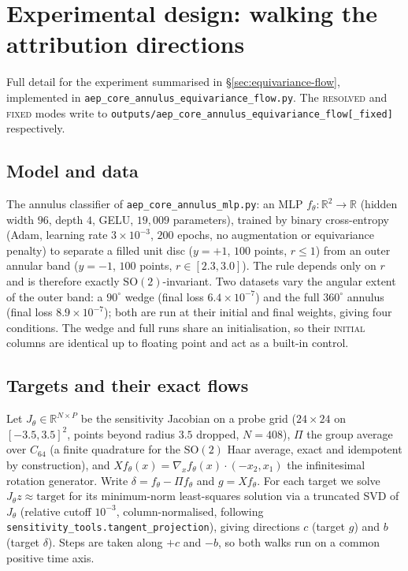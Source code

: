 \section{Experimental design: walking the attribution directions}
\label{app:equivariance-flow}

Full detail for the experiment summarised in
\S\ref{sec:equivariance-flow}, implemented in
\texttt{aep\_core\_annulus\_equivariance\_flow.py}. The \textsc{resolved} and
\textsc{fixed} modes write to
\texttt{outputs/aep\_core\_annulus\_equivariance\_flow[\_fixed]} respectively.

\subsection{Model and data}

The annulus classifier of \texttt{aep\_core\_annulus\_mlp.py}: an MLP
$f_\theta:\mathbb{R}^2\to\mathbb{R}$ (hidden width $96$, depth $4$, GELU,
$19{,}009$ parameters), trained by binary cross-entropy (Adam, learning rate
$3\times10^{-3}$, $200$ epochs, no augmentation or equivariance penalty) to
separate a filled unit disc ($y=+1$, $100$ points, $r\le1$) from an outer
annular band ($y=-1$, $100$ points, $r\in[2.3,3.0]$). The rule depends only
on $r$ and is therefore exactly $\mathrm{SO}(2)$-invariant. Two datasets vary
the angular extent of the outer band: a $90^\circ$ wedge (final loss
$6.4\times10^{-7}$) and the full $360^\circ$ annulus (final loss
$8.9\times10^{-7}$); both are run at their initial and final weights, giving
four conditions. The wedge and full runs share an initialisation, so their
\textsc{initial} columns are identical up to floating point and act as a
built-in control.

\subsection{Targets and their exact flows}

Let $J_\theta\in\mathbb{R}^{N\times P}$ be the sensitivity Jacobian on a
probe grid ($24\times24$ on $[-3.5,3.5]^2$, points beyond radius $3.5$
dropped, $N=408$), $\Pi$ the group average over $C_{64}$ (a finite
quadrature for the $\mathrm{SO}(2)$ Haar average, exact and idempotent by
construction), and $Xf_\theta(x)=\nabla_xf_\theta(x)\cdot(-x_2,x_1)$ the
infinitesimal rotation generator. Write $\delta=f_\theta-\Pi f_\theta$ and
$g=Xf_\theta$. For each target we solve $J_\theta z\approx\text{target}$ for
its minimum-norm least-squares solution via a truncated SVD of $J_\theta$
(relative cutoff $10^{-3}$, column-normalised, following
\texttt{sensitivity\_tools.tangent\_projection}), giving directions $c$
(target $g$) and $b$ (target $\delta$). Steps are taken along $+c$ and
$-b$, so both walks run on a common positive time axis.

